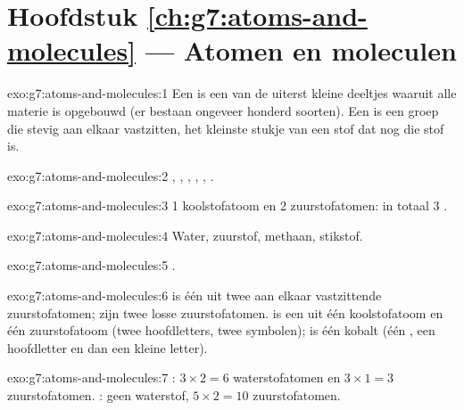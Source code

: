 \section*{Hoofdstuk \ref{ch:g7:atoms-and-molecules} --- Atomen en moleculen}

\begin{solution}{exo:g7:atoms-and-molecules:1}
Een  is een van de uiterst kleine deeltjes waaruit alle materie is
opgebouwd (er bestaan ongeveer honderd soorten). Een  is een
groep  die stevig aan elkaar vastzitten, het kleinste stukje van
een stof dat nog die stof is.
\end{solution}

\begin{solution}{exo:g7:atoms-and-molecules:2}
, , , , , .
\end{solution}

\begin{solution}{exo:g7:atoms-and-molecules:3}
1 koolstofatoom en 2 zuurstofatomen: in totaal 3 .
\end{solution}

\begin{solution}{exo:g7:atoms-and-molecules:4}
Water, zuurstof, methaan, stikstof.
\end{solution}

\begin{solution}{exo:g7:atoms-and-molecules:5}
.
\end{solution}

\begin{solution}{exo:g7:atoms-and-molecules:6}
 is één  uit twee aan elkaar vastzittende zuurstofatomen;
 zijn twee losse zuurstofatomen.  is een  uit één
koolstofatoom en één zuurstofatoom (twee hoofdletters, twee symbolen);
 is één  kobalt (één , een hoofdletter en dan een
kleine letter).
\end{solution}

\begin{solution}{exo:g7:atoms-and-molecules:7}
: $3\times 2 = 6$ waterstofatomen en $3\times 1 = 3$
zuurstofatomen. : geen waterstof, $5\times 2 = 10$
zuurstofatomen.
\end{solution}

